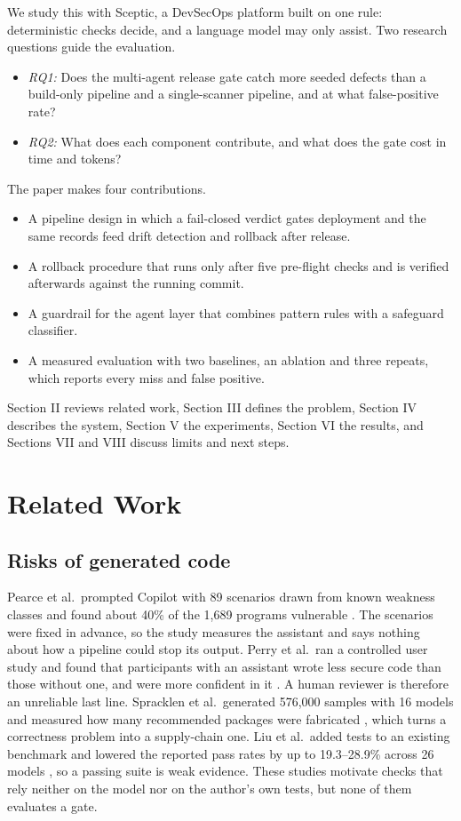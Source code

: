 \documentclass[12pt,onecolumn,draftclsnofoot]{IEEEtran}
\begin{document}
We study this with Sceptic, a DevSecOps platform built on one rule: deterministic checks decide, and a language model may only assist. Two research questions guide the evaluation.
\begin{itemize}
\item \emph{RQ1:} Does the multi-agent release gate catch more seeded defects than a build-only pipeline and a single-scanner pipeline, and at what false-positive rate?
\item \emph{RQ2:} What does each component contribute, and what does the gate cost in time and tokens?
\end{itemize}
The paper makes four contributions.
\begin{itemize}
\item A pipeline design in which a fail-closed verdict gates deployment and the same records feed drift detection and rollback after release.
\item A rollback procedure that runs only after five pre-flight checks and is verified afterwards against the running commit.
\item A guardrail for the agent layer that combines pattern rules with a safeguard classifier.
\item A measured evaluation with two baselines, an ablation and three repeats, which reports every miss and false positive.
\end{itemize}
Section II reviews related work, Section III defines the problem, Section IV describes the system, Section V the experiments, Section VI the results, and Sections VII and VIII discuss limits and next steps.

\section{Related Work}
\subsection{Risks of generated code}
Pearce et al.\ prompted Copilot with 89 scenarios drawn from known weakness classes and found about 40\% of the 1,689 programs vulnerable \cite{pearce2022}. The scenarios were fixed in advance, so the study measures the assistant and says nothing about how a pipeline could stop its output. Perry et al.\ ran a controlled user study and found that participants with an assistant wrote less secure code than those without one, and were more confident in it \cite{perry2023}. A human reviewer is therefore an unreliable last line. Spracklen et al.\ generated 576,000 samples with 16 models and measured how many recommended packages were fabricated \cite{spracklen2025}, which turns a correctness problem into a supply-chain one. Liu et al.\ added tests to an existing benchmark and lowered the reported pass rates by up to 19.3--28.9\% across 26 models \cite{liu2023evalplus}, so a passing suite is weak evidence. These studies motivate checks that rely neither on the model nor on the author's own tests, but none of them evaluates a gate.
\end{document}
